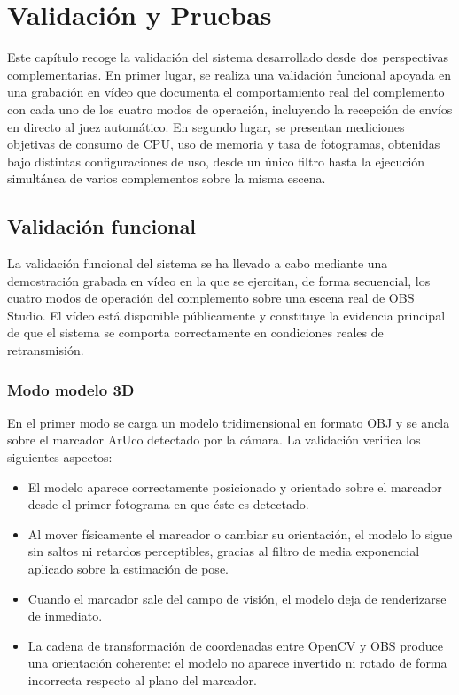\chapter{Validación y Pruebas}
\label{cap:validacion}


Este capítulo recoge la validación del sistema desarrollado desde dos perspectivas complementarias. En primer lugar, se realiza una validación funcional apoyada en una grabación en vídeo que documenta el comportamiento real del complemento con cada uno de los cuatro modos de operación, incluyendo la recepción de envíos en directo al juez automático. En segundo lugar, se presentan mediciones objetivas de consumo de CPU, uso de memoria y tasa de fotogramas, obtenidas bajo distintas configuraciones de uso, desde un único filtro hasta la ejecución simultánea de varios complementos sobre la misma escena.

\section{Validación funcional}
\label{sec:validacion_funcional}

La validación funcional del sistema se ha llevado a cabo mediante una demostración grabada en vídeo en la que se ejercitan, de forma secuencial, los cuatro modos de operación del complemento sobre una escena real de OBS Studio. El vídeo está disponible públicamente \citep{VideoValidacion} y constituye la evidencia principal de que el sistema se comporta correctamente en condiciones reales de retransmisión.

\subsection{Modo modelo 3D}
\label{sec:val_modo3d}

En el primer modo se carga un modelo tridimensional en formato OBJ y se ancla sobre el marcador ArUco detectado por la cámara. La validación verifica los siguientes aspectos:

\begin{itemize}
  \item El modelo aparece correctamente posicionado y orientado sobre el marcador desde el primer fotograma en que éste es detectado.
  \item Al mover físicamente el marcador o cambiar su orientación, el modelo lo sigue sin saltos ni retardos perceptibles, gracias al filtro de media exponencial aplicado sobre la estimación de pose.
  \item Cuando el marcador sale del campo de visión, el modelo deja de renderizarse de inmediato.
  \item La cadena de transformación de coordenadas entre OpenCV y OBS produce una orientación coherente: el modelo no aparece invertido ni rotado de forma incorrecta respecto al plano del marcador.
\end{itemize}

